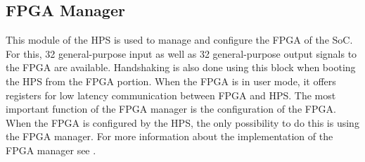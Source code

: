 \subsection{FPGA Manager}
This module of the HPS is used to manage and configure the FPGA of the SoC. For this, 32 general-purpose input as well as 32 general-purpose output signals to the FPGA are available. Handshaking is also done using this block when booting the HPS from the FPGA portion. When the FPGA is in user mode, it offers registers for low latency communication between FPGA and HPS. The most important function of the FPGA manager is the configuration of the FPGA. When the FPGA is configured by the HPS, the only possibility to do this is using the FPGA manager.
For more information about the implementation of the FPGA manager see \cite[chapter 5]{AlteraHPS15}.
